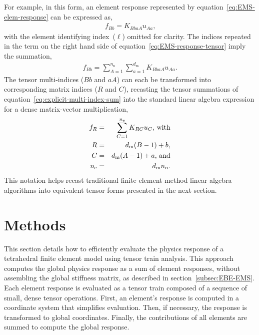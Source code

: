 \documentclass[]             %
{NASA}                       %
\begin{document}
For example, in this form, an element response represented by
equation~\ref{eq:EMS-elem-response} can be expressed as,
\begin{eqnarray}
f_{Bb} = K_{BbaA}u_{Aa}\text{,}\label{eq:EMS-response-tensor}
\end{eqnarray}
with the element identifying index~($\ell$) omitted for clarity.
 The indices repeated in the term on the right hand side of
 equation~\ref{eq:EMS-response-tensor} imply the summation,
\begin{eqnarray}
f_{Bb} = \sum_{A=1}^{n_{\mathrm{n}}}\sum_{a=1}^{d_{\mathrm{m}}}K_{BbaA}u_{Aa}\text{.}\label{eq:explicit-multi-index-sum}
\end{eqnarray}
The tensor multi-indices
($Bb$ and $aA$) can each be transformed into corresponding matrix indices
(${R}$ and ${C}$), recasting the tensor summations of
equation~\ref{eq:explicit-multi-index-sum} into the standard linear algebra expression
for a dense matrix-vector multiplication,
\begin{eqnarray}
f_{R} & = & \sum_{{C}=1}^{n_{\mathrm{e}}}K_{{R}{C}}u_{C}\text{, with} \\
{R} & = & d_{\mathrm{m}}(B-1)+b\text{,} \nonumber \\
{C} & = & d_{\mathrm{m}}(A-1)+a\text{\text{, and}} \nonumber \\
n_{\mathrm{e}} & = & d_{\mathrm{m}}n_{\mathrm{n}}\text{.} \nonumber
\end{eqnarray}
This notation helps recast traditional finite element method linear algebra
 algorithms into equivalent tensor forms presented in the next section.

\section{Methods}
\label{sec:Methods}

This section details how to efficiently evaluate the physics response of a tetrahedral finite element model using tensor train analysis. This approach computes the global physics response as a sum of element responses, without assembling the global stiffness matrix, as described in section~\ref{subsec:EBE-EMS}. Each element response is evaluated as a tensor train composed of a sequence of small, dense tensor operations. First, an element's response is computed in a coordinate system that simplifies evaluation. Then, if necessary, the response is transformed to global coordinates. Finally, the contributions of all elements are summed to compute the global response.
\end{document}
